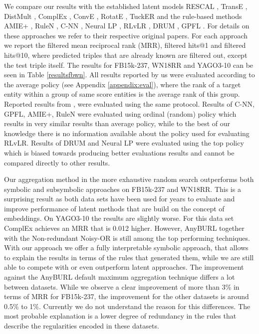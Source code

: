 \documentclass[akbc,twoside,11pt,lettersize]{article}
\begin{document}
We compare our results with the established latent models RESCAL \cite{nickel_2011}, TransE \cite{bordes_2013}, DistMult \cite{yang2015embedding}, ComplEx \cite{pmlr-v48-trouillon16}, ConvE \cite{dettmers_2018}, RotatE \cite{sun2018rotate}, TuckER \cite{balazevic-etal-2019-tucker} and the rule-based methods AMIE+ \cite{Galarraga2015}, RuleN \cite{madoc45092}, C-NN \cite{Ferre2020}, Neural LP \cite{neurallp}, RLvLR \cite{rlvlr}, DRUM \cite{drum}, GPFL \cite{gu2020learning}. For details on these approaches we refer to their respective original papers. For each approach we report the filtered mean reciprocal rank (MRR), filtered hits@1 and filtered hits@10, where predicted triples that are already known are filtered out, except the test triple itself. The results for FB15k-237, WN18RR and YAGO3-10 can be seen in Table \ref{resultsfbwn}. All results reported by us were evaluated according to the average policy \cite{Rossi2021} (see Appendix \ref{appendix:eval}), where the rank of a target entity within a group of same score entities is the average rank of this group. Reported results from \cite{Rossi2021}, \cite{Ruffinelli2020You} were evaluated using the same protocol. Results of C-NN, GPFL, AMIE+, RuleN were evaluated using ordinal (random) policy which results in very similar results than average policy, while to the best of our knowledge there is no information available about the policy used for evaluating RLvLR. Results of DRUM and Neural LP were evaluated using the top policy which is biased towards producing better evaluations results and cannot be compared directly to other results.

Our aggregation method in the more exhaustive random search outperforms both symbolic and subsymbolic approaches on FB15k-237 and WN18RR. This is a surprising result as both data sets have been used for years to evaluate and improve performance of latent methods that are build on the concept of embeddings. On YAGO3-10 the results are slightly worse. For this data set ComplEx achieves an MRR that is 0.012 higher. However, AnyBURL together with the Non-redundant Noisy-OR is still among the top performing techniques. With our approach we offer a fully interpretable symbolic approach, that allows to explain the results in terms of the rules that generated them, while we are still able to compete with or even outperform latent approaches. The improvement against the AnyBURL default maximum aggregation technique differs a lot between datasets. While we observe a clear improvement of more than 3\% in terms of MRR for FB15k-237, the improvement for the other datasets is around 0.5\% to 1\%. Currently we do not understand the reason for this differences. The most probable explanation is a lower degree of redundancy in the rules that describe the regularities encoded in these datasets.
\end{document}
